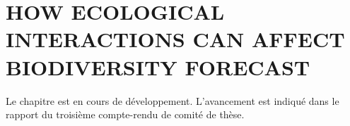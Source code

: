 \chapter{HOW ECOLOGICAL INTERACTIONS CAN AFFECT BIODIVERSITY FORECAST}

Le chapitre est en cours de développement. L'avancement est indiqué dans le rapport du troisième compte-rendu de comité de thèse.
